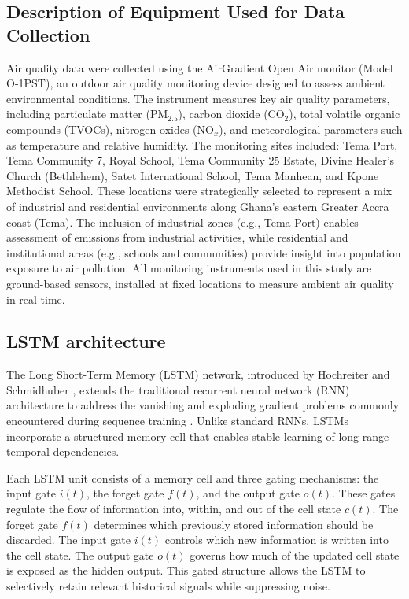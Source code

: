 \documentclass[a4paper,fleqn]{cas-sc}
\begin{document}
\subsection{Description of Equipment Used for Data Collection}
Air quality data were collected using the AirGradient Open Air monitor (Model O-1PST), an outdoor air quality monitoring device designed to assess ambient environmental conditions. The instrument measures key air quality parameters, including particulate matter (PM$_{2.5}$), carbon dioxide (CO$_2$), total volatile organic compounds (TVOCs), nitrogen oxides (NO$_x$), and meteorological parameters such as temperature and relative humidity. 
The monitoring sites included: Tema Port, Tema Community 7, Royal School, Tema Community 25 Estate, Divine Healer’s Church (Bethlehem), Satet International School, Tema Manhean, and Kpone Methodist School.
These locations were strategically selected to represent a mix of industrial and residential environments along Ghana’s eastern Greater Accra coast (Tema). The inclusion of industrial zones (e.g., Tema Port) enables assessment of emissions from industrial activities, while residential and institutional areas (e.g., schools and communities) provide insight into population exposure to air pollution. 
All monitoring instruments used in this study are ground-based sensors, installed at fixed locations to measure ambient air quality in real time.


\subsection{LSTM architecture}
The Long Short-Term Memory (LSTM) network, introduced by Hochreiter and Schmidhuber \cite{hochreiter1997long}, extends the traditional recurrent neural network (RNN) architecture to address the vanishing and exploding gradient problems commonly encountered during sequence training \cite{abbasimehr2022improving}. Unlike standard RNNs, LSTMs incorporate a structured memory cell that enables stable learning of long-range temporal dependencies.

Each LSTM unit consists of a memory cell and three gating mechanisms: the input gate $i(t)$, the forget gate $f(t)$, and the output gate $o(t)$. These gates regulate the flow of information into, within, and out of the cell state $c(t)$. The forget gate $f(t)$ determines which previously stored information should be discarded. The input gate $i(t)$ controls which new information is written into the cell state. The output gate $o(t)$ governs how much of the updated cell state is exposed as the hidden output. This gated structure allows the LSTM to selectively retain relevant historical signals while suppressing noise.
\end{document}
